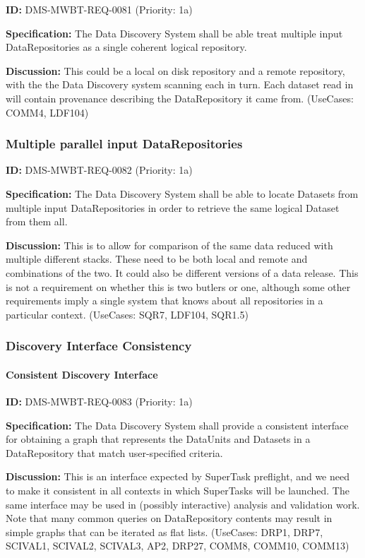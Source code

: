 \documentclass[SE,toc,lsstdraft]{lsstdoc}
\begin{document}
\label{DMS-MWBT-REQ-0081}
\textbf{ID:} DMS-MWBT-REQ-0081 (Priority: 1a)

\textbf{Specification:}
The Data Discovery System shall be able treat multiple input DataRepositories as a single coherent logical repository.

\textbf{Discussion:}
This could be a local on disk repository and a remote repository, with the the Data Discovery system scanning each in turn. Each dataset read in will contain provenance describing the DataRepository it came from. (UseCases: COMM4, LDF104)

\subsubsection{Multiple parallel input DataRepositories}

\label{DMS-MWBT-REQ-0082}
\textbf{ID:} DMS-MWBT-REQ-0082 (Priority: 1a)

\textbf{Specification:}
The Data Discovery System shall be able to locate Datasets from multiple input DataRepositories in order to retrieve the same logical Dataset from them all.

\textbf{Discussion:}
This is to allow for comparison of the same data reduced with multiple different stacks. These need to be both local and remote and combinations of the two. It could also be different versions of a data release. This is not a requirement on whether this is two butlers or one, although some other requirements imply a single system that knows about all repositories in a particular context. (UseCases: SQR7, LDF104, SQR1.5)

\subsubsection{Discovery Interface Consistency}

\paragraph{Consistent Discovery Interface}\hfill  %

\label{DMS-MWBT-REQ-0083}
\textbf{ID:} DMS-MWBT-REQ-0083 (Priority: 1a)

\textbf{Specification:}
The Data Discovery System shall provide a consistent interface for obtaining a graph that represents the DataUnits and Datasets in a DataRepository that match user-specified criteria.

\textbf{Discussion:}
This is an interface expected by SuperTask preflight, and we need to make it consistent in all contexts in which SuperTasks will be launched. The same interface may be used in (possibly interactive) analysis and validation work. Note that many common queries on DataRepository contents may result in simple graphs that can be iterated as flat lists. (UseCases: DRP1, DRP7, SCIVAL1, SCIVAL2, SCIVAL3, AP2, DRP27, COMM8, COMM10, COMM13)
\end{document}
